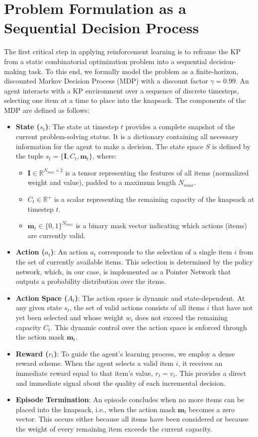 \section{Problem Formulation as a Sequential Decision Process}
The first critical step in applying reinforcement learning is to reframe the KP from a static combinatorial optimization problem into a sequential decision-making task.
To this end, we formally model the problem as a finite-horizon, discounted Markov Decision Process (MDP) with a discount factor $\gamma = 0.99$.
An agent interacts with a KP environment over a sequence of discrete timesteps, selecting one item at a time to place into the knapsack.
The components of the MDP are defined as follows:
\begin{itemize}
    \item \textbf{State (\(s_t\))}: The state at timestep \(t\) provides a complete snapshot of the current problem-solving status. It is a dictionary containing all necessary information for the agent to make a decision. The state space \(S\) is defined by the tuple \(s_t = \{ \mathbf{I}, C_t, \mathbf{m}_t \}\), where:
    \begin{itemize}
        \item \(\mathbf{I} \in \mathbb{R}^{N_{max} \times 2}\) is a tensor representing the features of all items (normalized weight and value), padded to a maximum length \(N_{max}\).
        \item \(C_t \in \mathbb{R}^+\) is a scalar representing the remaining capacity of the knapsack at timestep \(t\).
        \item \(\mathbf{m}_t \in \{0, 1\}^{N_{max}}\) is a binary mask vector indicating which actions (items) are currently valid.
    \end{itemize}
    \item \textbf{Action (\(a_t\))}: An action \(a_t\) corresponds to the selection of a single item \(i\) from the set of currently available items.
    This selection is determined by the policy network, which, in our case, is implemented as a Pointer Network that outputs a probability distribution over the items.
    \item \textbf{Action Space (\(A_t\))}: The action space is dynamic and state-dependent.
    At any given state \(s_t\), the set of valid actions consists of all items \(i\) that have not yet been selected and whose weight \(w_i\) does not exceed the remaining capacity \(C_t\).
    This dynamic control over the action space is enforced through the action mask \(\mathbf{m}_t\).
    \item \textbf{Reward (\(r_t\))}: To guide the agent's learning process, we employ a dense reward scheme.
    When the agent selects a valid item \(i\), it receives an immediate reward equal to that item's value, \(r_t = v_i\).
    This provides a direct and immediate signal about the quality of each incremental decision.
    \item \textbf{Episode Termination}: An episode concludes when no more items can be placed into the knapsack, i.e., when the action mask \(\mathbf{m}_t\) becomes a zero vector. This occurs either because all items have been considered or because the weight of every remaining item exceeds the current capacity.
\end{itemize}
